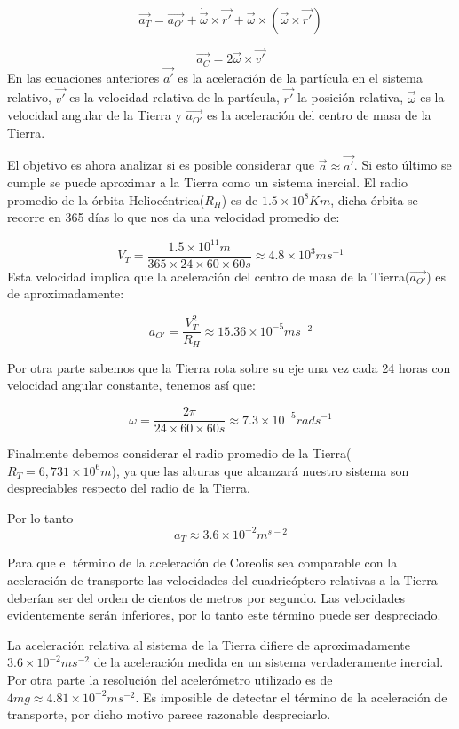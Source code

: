 \documentclass[main]{subfiles}
\begin{document}
\begin{equation}
\vec{a_T}=\vec{a_{O\prime}}+\dot{\vec{\omega}}\times\vec{r\prime}+\vec{\omega}\times (\vec{\omega}\times\vec{r\prime})
\end{equation}

\begin{equation}
\vec{a_C}=2\vec{\omega}\times\vec{v\prime}
\end{equation}
En las ecuaciones anteriores $\vec{a\prime}$ es la aceleraci\'on de la part\'icula en el sistema relativo, $\vec{v\prime}$ es la velocidad relativa de la part\'icula, $\vec{r\prime}$ la posici\'on relativa, $\vec{\omega}$ es la velocidad angular de la Tierra y $\vec{a_{O\prime}}$ es la aceleraci\'on del centro de masa de la Tierra.

El objetivo es ahora analizar si es posible considerar que $\vec{a}\approx\vec{a\prime}$. Si esto \'ultimo se cumple se puede aproximar a la Tierra como un sistema inercial. El radio promedio de la \'orbita Helioc\'entrica($R_H$) es de $1.5\times10^8Km$, dicha \'orbita se recorre en 365 d\'ias lo que nos da una velocidad promedio de:

$$V_T=\frac{1.5\times10^{11}m}{365\times24\times60\times60s}\approx4.8\times10^3ms^{-1}$$
Esta velocidad implica que la aceleraci\'on del centro de masa de la Tierra($\vec{a_{O\prime}}$) es de aproximadamente:

$$a_{O\prime}=\frac{V_T^2}{R_H}\approx15.36\times10^{-5}ms^{-2}$$

Por otra parte sabemos que la Tierra rota sobre su eje una vez cada 24 horas con velocidad angular constante, tenemos as\'i que:

$$
\omega=\frac{2\pi}{24\times60\times60s}\approx7.3\times10^{-5}rad s^{-1}
$$

Finalmente debemos considerar el radio promedio de la Tierra($R_T=6,731\times10^{6}m$), ya que las alturas que alcanzar\'a nuestro sistema son despreciables respecto del radio de la Tierra. 

Por lo tanto 
$$
a_T \approx 3.6\times10^{-2}m^{s-2}
$$

Para que el t\'ermino de la aceleraci\'on de Coreolis sea comparable con la aceleraci\'on de transporte las velocidades del cuadric\'optero relativas a la Tierra deber\'ian ser del orden de cientos de metros por segundo. Las velocidades evidentemente ser\'an inferiores, por lo tanto este t\'ermino puede ser despreciado. 

La aceleraci\'on relativa al sistema de la Tierra difiere de  aproximadamente $3.6\times10^{-2}ms^{-2}$ de la aceleraci\'on medida en un sistema verdaderamente inercial. Por otra parte la resoluci\'on del aceler\'ometro utilizado es de $4mg\approx 4.81\times10^{-2}ms^{-2}$. Es imposible de detectar el t\'ermino de la aceleraci\'on de transporte, por dicho motivo parece razonable despreciarlo. \\
\end{document}
